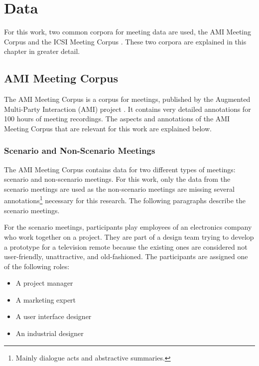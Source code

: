 \chapter{Data}\label{ch:data}

For this work, two common corpora for meeting data are used, the AMI Meeting Corpus \cite{Mccowan05theami} and the ICSI Meeting Corpus \cite{Janin}.
These two corpora are explained in this chapter in greater detail.


\section{AMI Meeting Corpus}\label{sec:ami-meeting-corpus}

The AMI Meeting Corpus is a corpus for meetings, published by the Augmented Multi-Party Interaction (AMI) project \cite{Mccowan05theami}.
It contains very detailed annotations for 100 hours of meeting recordings.
The aspects and annotations of the AMI Meeting Corpus that are relevant for this work are explained below.

\subsection{Scenario and Non-Scenario Meetings}

The AMI Meeting Corpus contains data for two different types of meetings: scenario and non-scenario meetings.
For this work, only the data from the scenario meetings are used as the non-scenario meetings are missing several annotations\footnote{Mainly dialogue acts and abstractive summaries.} necessary for this research.
The following paragraphs describe the scenario meetings.

For the scenario meetings, participants play employees of an electronics company who work together on a project.
They are part of a design team trying to develop a prototype for a television remote because the existing ones are considered not user-friendly, unattractive, and old-fashioned.
The participants are assigned one of the following roles:
\begin{itemize}
\item A project manager
\item A marketing expert
\item A user interface designer
\item An industrial designer
\end{itemize}

